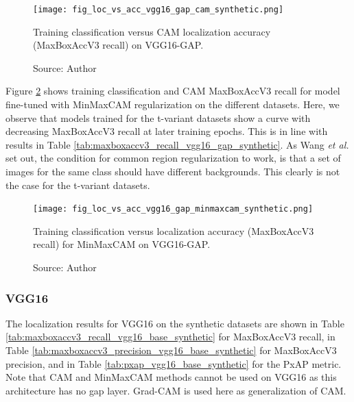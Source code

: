\begin{figure}[ht]
    \begin{center}       
    \texttt{[image: fig\_loc\_vs\_acc\_vgg16\_gap\_cam\_synthetic.png]}
    \caption[Training classification versus CAM localization accuracy on VGG16-GAP]{Training classification versus CAM localization accuracy (MaxBoxAccV3 recall) on VGG16-GAP.}
    \caption*{Source: Author}
    \label{fig:loc_vs_acc_vgg16_gap_cam_synthetic}
    \end{center}
\end{figure}

Figure \ref{fig:loc_vs_acc_vgg16_gap_minmaxcam_synthetic} shows training classification and CAM MaxBoxAccV3 recall for model fine-tuned with MinMaxCAM regularization on the different datasets. Here, we observe that models trained for the t-variant datasets show a curve with decreasing MaxBoxAccV3 recall at later training epochs. This is in line with results in Table \ref{tab:maxboxaccv3_recall_vgg16_gap_synthetic}. As Wang \textit{et al.} \cite{wang2021minmaxcam} set out, the condition for common region regularization to work, is that a set of images for the same class should have different backgrounds. This clearly is not the case for the t-variant datasets.

\begin{figure}[ht]
    \begin{center}       
    \texttt{[image: fig\_loc\_vs\_acc\_vgg16\_gap\_minmaxcam\_synthetic.png]}
    \caption[Training classification versus localization accuracy for MinMaxCAM on VGG16-GAP]{Training classification versus localization accuracy (MaxBoxAccV3 recall) for MinMaxCAM on VGG16-GAP.}
    \caption*{Source: Author}
    \label{fig:loc_vs_acc_vgg16_gap_minmaxcam_synthetic}
    \end{center}
\end{figure}

\subsubsection{VGG16}
The localization results for VGG16 on the synthetic datasets are shown in Table \ref{tab:maxboxaccv3_recall_vgg16_base_synthetic} for MaxBoxAccV3 recall, in Table \ref{tab:maxboxaccv3_precision_vgg16_base_synthetic} for MaxBoxAccV3 precision, and in Table \ref{tab:pxap_vgg16_base_synthetic} for the PxAP metric. Note that CAM and MinMaxCAM methods cannot be used on VGG16 as this architecture has no \acrshort{gap} layer. Grad-CAM is used here as generalization of CAM.

